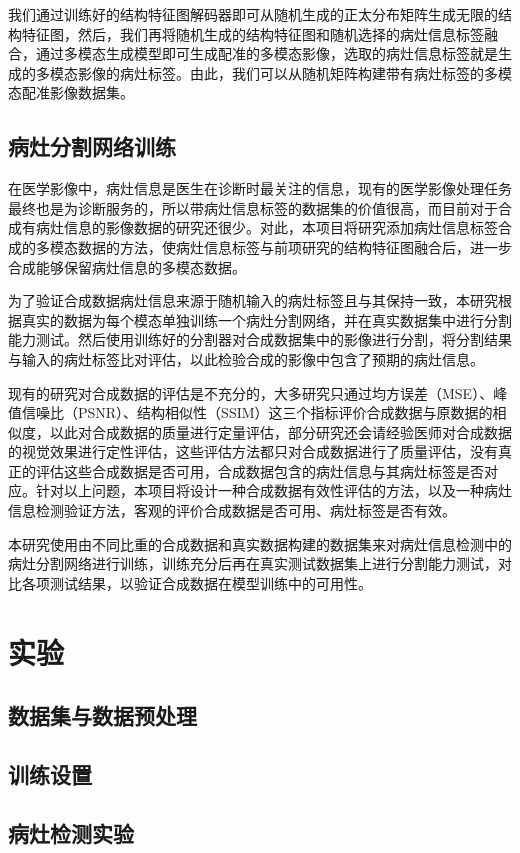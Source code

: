 \documentclass[letterpaper]{article} %
\begin{document}
我们通过训练好的结构特征图解码器即可从随机生成的正太分布矩阵生成无限的结构特征图，然后，我们再将随机生成的结构特征图和随机选择的病灶信息标签融合，通过多模态生成模型即可生成配准的多模态影像，选取的病灶信息标签就是生成的多模态影像的病灶标签。由此，我们可以从随机矩阵构建带有病灶标签的多模态配准影像数据集。

\subsection{病灶分割网络训练}
在医学影像中，病灶信息是医生在诊断时最关注的信息，现有的医学影像处理任务最终也是为诊断服务的，所以带病灶信息标签的数据集的价值很高，而目前对于合成有病灶信息的影像数据的研究还很少。对此，本项目将研究添加病灶信息标签合成的多模态数据的方法，使病灶信息标签与前项研究的结构特征图融合后，进一步合成能够保留病灶信息的多模态数据。

为了验证合成数据病灶信息来源于随机输入的病灶标签且与其保持一致，本研究根据真实的数据为每个模态单独训练一个病灶分割网络，并在真实数据集中进行分割能力测试。然后使用训练好的分割器对合成数据集中的影像进行分割，将分割结果与输入的病灶标签比对评估，以此检验合成的影像中包含了预期的病灶信息。

现有的研究对合成数据的评估是不充分的，大多研究只通过均方误差（MSE）、峰值信噪比（PSNR）、结构相似性（SSIM）这三个指标评价合成数据与原数据的相似度，以此对合成数据的质量进行定量评估，部分研究还会请经验医师对合成数据的视觉效果进行定性评估，这些评估方法都只对合成数据进行了质量评估，没有真正的评估这些合成数据是否可用，合成数据包含的病灶信息与其病灶标签是否对应。针对以上问题，本项目将设计一种合成数据有效性评估的方法，以及一种病灶信息检测验证方法，客观的评价合成数据是否可用、病灶标签是否有效。

本研究使用由不同比重的合成数据和真实数据构建的数据集来对病灶信息检测中的病灶分割网络进行训练，训练充分后再在真实测试数据集上进行分割能力测试，对比各项测试结果，以验证合成数据在模型训练中的可用性。

\section{实验}
\subsection{数据集与数据预处理}
\subsection{训练设置}
\subsection{病灶检测实验}
\end{document}
